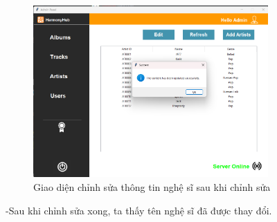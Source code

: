 \documentclass[a4paper]{article}
\begin{document}
\begin{flushleft}
	\begin{figure}
		\centering
		\includegraphics[width=0.8\textwidth]{images/aftereditingartist.png}
		\caption{Giao diện chỉnh sửa thông tin nghệ sĩ sau khi chỉnh sửa}
	\end{figure}

	-Sau khi chỉnh sửa xong, ta thấy tên nghệ sĩ đã được thay đổi.
\end{flushleft}
\clearpage
\newpage
\end{document}
